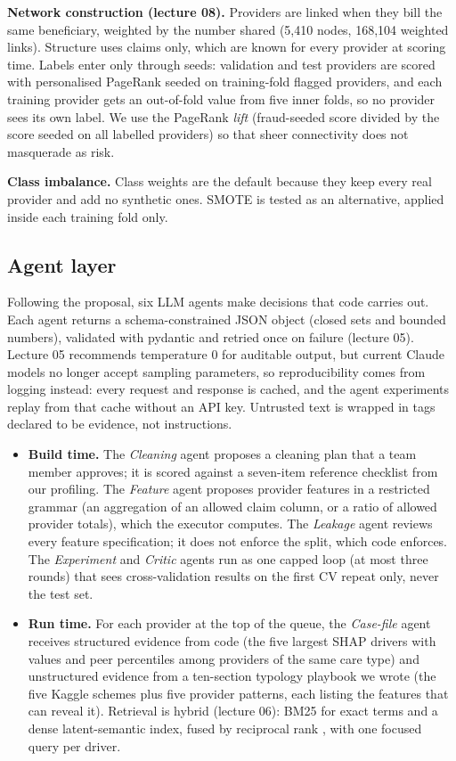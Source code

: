 \documentclass[11pt,a4paper]{article}
\begin{document}
\textbf{Network construction (lecture 08).} Providers are linked when they bill the same beneficiary, weighted by the number shared (5,410 nodes, 168,104 weighted links). Structure uses claims only, which are known for every provider at scoring time. Labels enter only through seeds: validation and test providers are scored with personalised PageRank seeded on training-fold flagged providers, and each training provider gets an out-of-fold value from five inner folds, so no provider sees its own label. We use the PageRank \emph{lift} (fraud-seeded score divided by the score seeded on all labelled providers) so that sheer connectivity does not masquerade as risk.

\textbf{Class imbalance.} Class weights are the default because they keep every real provider and add no synthetic ones. SMOTE \cite{smote} is tested as an alternative, applied inside each training fold only.

\subsection{Agent layer}\label{sec:agents}

Following the proposal, six LLM agents make decisions that code carries out. Each agent returns a schema-constrained JSON object (closed sets and bounded numbers), validated with pydantic and retried once on failure (lecture 05). Lecture 05 recommends temperature 0 for auditable output, but current Claude models no longer accept sampling parameters, so reproducibility comes from logging instead: every request and response is cached, and the agent experiments replay from that cache without an API key. Untrusted text is wrapped in tags declared to be evidence, not instructions.

\begin{itemize}
\item \textbf{Build time.} The \emph{Cleaning} agent proposes a cleaning plan that a team member approves; it is scored against a seven-item reference checklist from our profiling. The \emph{Feature} agent proposes provider features in a restricted grammar (an aggregation of an allowed claim column, or a ratio of allowed provider totals), which the executor computes. The \emph{Leakage} agent reviews every feature specification; it does not enforce the split, which code enforces. The \emph{Experiment} and \emph{Critic} agents run as one capped loop (at most three rounds) that sees cross-validation results on the first CV repeat only, never the test set.
\item \textbf{Run time.} For each provider at the top of the queue, the \emph{Case-file} agent receives structured evidence from code (the five largest SHAP drivers with values and peer percentiles among providers of the same care type) and unstructured evidence from a ten-section typology playbook we wrote (the five Kaggle schemes plus five provider patterns, each listing the features that can reveal it). Retrieval is hybrid (lecture 06): BM25 for exact terms and a dense latent-semantic index, fused by reciprocal rank \cite{rrf}, with one focused query per driver.
\end{itemize}
\end{document}
